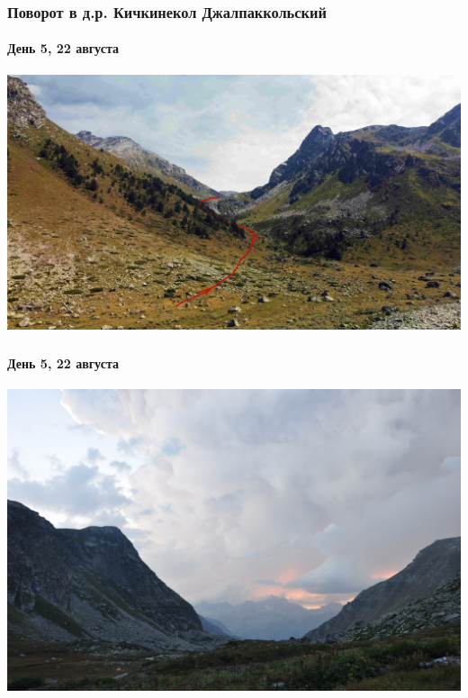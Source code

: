 \begin{frame}
	\frametitle{Поворот в д.р. Кичкинекол Джалпаккольский}
	\framesubtitle{День 5, 22 августа}
	\centering
	\includegraphics[width=\textwidth]{../pics/DJI_0835}			
\end{frame}



\begin{frame}
	\frametitle{\textAlpha\textpi \textomikron\textkappa\textalpha\textlambda\textnu\textpsi\textiota\textvarsigma}
	\framesubtitle{День 5, 22 августа}
	\centering
	\includegraphics[width=\textwidth]{../pics/DSC_0010}			
\end{frame}
